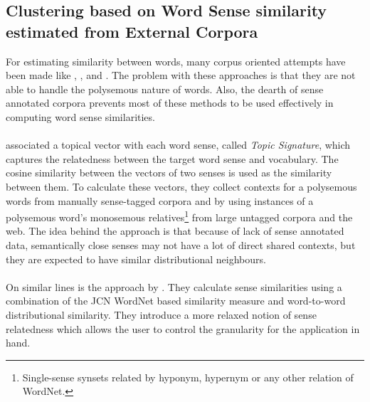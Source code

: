 \subsection{Clustering based on Word Sense similarity estimated from External Corpora}
For estimating similarity between words, many corpus oriented attempts have been made like \citep{Pereira:93a}, \citep{Lin:1998}, \citep{kolb2008disco} and \citep{agirre2009study}. The problem with these approaches is that they are not able to handle the polysemous nature of words. Also, the dearth of sense annotated corpora prevents most of these methods to be used effectively in computing word sense similarities.

\paragraph{}
\citep{agirre2003clustering} associated a topical vector with each word sense, called \textit{Topic Signature}, which captures the relatedness between the target word sense and vocabulary. The cosine similarity between the vectors of two senses is used as the similarity between them. To calculate these vectors, they collect contexts for a polysemous words from manually sense-tagged corpora and by using instances of a polysemous word's monosemous relatives\footnote{Single-sense synsets related by hyponym, hypernym or any other relation of WordNet.} from large untagged corpora and the web. The idea behind the approach is that because of lack of sense annotated data, semantically close senses may not have a lot of direct shared contexts, but they are expected to have similar distributional neighbours.

\paragraph{}
On similar lines is the approach by \citep{mccarthy2006relating}. They calculate sense similarities using a combination of the JCN WordNet based similarity measure \citep{JCN:1997} and word-to-word distributional similarity. They introduce a more relaxed notion of sense relatedness which allows the user to control the granularity for the application in hand.

